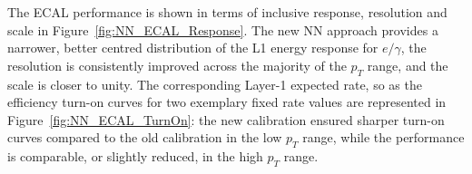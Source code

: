 \begin{figure}
    \centering
    
    \caption{}
    \label{fig:NN_HCAL_TurnOn}
\end{figure}

The ECAL performance is shown in terms of inclusive response, resolution and scale in Figure~\ref{fig:NN_ECAL_Response}. The new NN approach provides a narrower, better centred distribution of the L1 energy response for $e/\gamma$, the resolution is consistently improved across the majority of the $p_T$ range, and the scale is closer to unity. The corresponding Layer-1 expected rate, so as the efficiency turn-on curves for two exemplary fixed rate values are represented in Figure~\ref{fig:NN_ECAL_TurnOn}: the new calibration ensured sharper turn-on curves compared to the old calibration in the low $p_T$ range, while the performance is comparable, or slightly reduced, in the high $p_T$ range.

